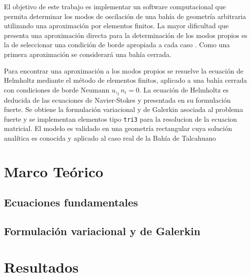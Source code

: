 \documentclass[12pt, letterpaper]{article}
\begin{document}
El objetivo de este trabajo es implementar un software computacional que permita determinar los modos de oscilaci\'on de una bah\'ia de geometr\'ia arbitraria utilizando una aproximaci\'on por elementos finitos. La mayor dificultad que presenta una aproximaci\'on directa para la determinaci\'on de los modos propios es la de seleccionar una condici\'on de borde apropiada a cada caso \cite{Mei2005, Rabino2009}. Como una primera aproximaci\'on se considerar\'a una bah\'ia cerrada.

Para encontrar una aproximaci\'on a los modos propios se resuelve la ecuaci\'on de Helmholtz mediante el m\'etodo de elementos finitos, aplicado a una bah\'ia cerrada con condiciones de borde Neumann $u,_i  n_i = 0$. La ecuaci\'on de Helmholtz es deducida de las ecuaciones de Navier-Stokes y presentada en su formulaci\'on fuerte. Se obtiene la formulaci\'on variacional y de Galerkin asociada al problema fuerte y se implementan elementos tipo \verb;tri3; para la resolucion de la ecuacion matricial. El modelo es validado en una geometr\'ia rectangular cuya soluci\'on anal\'itica es conocida y aplicado al caso real de la Bah\'ia de Talcahuano


\section{Marco Te\'orico}
  \subsection{Ecuaciones fundamentales}
  \label{subsec:ecuaciones}
  
  \subsection{Formulaci\'on variacional y de Galerkin}
  
\section{Resultados}
  
  
%   
\end{document}
